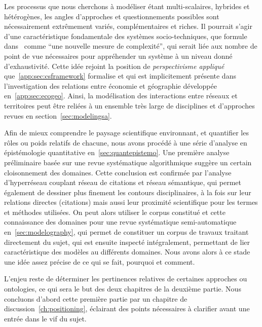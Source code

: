 
Les processus que nous cherchons à modéliser étant multi-scalaires, hybrides et hétérogènes, les angles d'approches et questionnements possibles sont nécessairement extrêmement variés, complémentaires et riches. Il pourrait s'agir d'une caractéristique fondamentale des systèmes socio-techniques, que  formule dans~\cite{pumain2005cumulativite} comme ``une nouvelle mesure de complexité'', qui serait liée aux nombre de point de vue nécessaires pour appréhender un système à un niveau donné d'exhaustivité. Cette idée rejoint la position de \emph{perspectivisme appliqué} que~\ref{app:sec:csframework} formalise et qui est implicitement présente dans l'investigation des relations entre économie et géographie développée en~\ref{app:sec:ecogeo}. Ainsi, la modélisation des interactions entre réseaux et territoires peut être reliées à un ensemble très large de disciplines et d'approches revues en section~\ref{sec:modelingsa}.

Afin de mieux comprendre le paysage scientifique environnant, et quantifier les rôles ou poids relatifs de chacune, nous avons procédé à une série d'analyse en épistémologie quantitative en~\ref{sec:quantepistemo}. Une première analyse préliminaire basée sur une revue systématique algorithmique suggère un certain cloisonnement des domaines. Cette conclusion est confirmée par l'analyse d'hyperréseau couplant réseau de citations et réseau sémantique, qui permet également de dessiner plus finement les contours disciplinaires, à la fois sur leur relations directes (citations) mais aussi leur proximité scientifique pour les termes et méthodes utilisées. On peut alors utiliser le corpus constitué et cette connaissance des domaines pour une revue systématique semi-automatique en~\ref{sec:modelography}, qui permet de constituer un corpus de travaux traitant directement du sujet, qui est ensuite inspecté intégralement, permettant de lier caractéristique des modèles au différents domaines. Nous avons alors à ce stade une idée assez précise de ce qui se fait, pourquoi et comment.


L'enjeu reste de déterminer les pertinences relatives de certaines approches ou ontologies, ce qui sera le but des deux chapitres de la deuxième partie. Nous concluons d'abord cette première partie par un chapitre de discussion~\ref{ch:positioning}, éclairant des points nécessaires à clarifier avant une entrée dans le vif du sujet.






\stars
